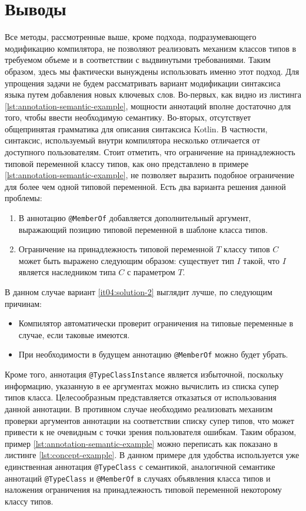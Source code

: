\section{Выводы}

Все методы, рассмотренные выше, кроме подхода, подразумевающего модификацию компилятора, не позволяют реализовать механизм классов типов в требуемом объеме и в соответствии с выдвинутыми требованиями. Таким образом, здесь мы фактически вынуждены использовать именно этот подход. Для упрощения задачи не будем рассматривать вариант модификации синтаксиса языка путем добавления новых ключевых слов. Во-первых, как видно из листинга \ref{lst:annotation-semantic-example}, мощности аннотаций вполне достаточно для того, чтобы ввести необходимую семантику. Во-вторых, отсутствует общепринятая грамматика для описания синтаксиса Kotlin. В частности, синтаксис, используемый внутри компилятора несколько отличается от доступного пользователям. Стоит отметить, что ограничение на принадлежность типовой переменной классу типов, как оно представлено в примере \ref{lst:annotation-semantic-example}, не позволяет выразить подобное ограничение для более чем одной типовой переменной. Есть два варианта решения данной проблемы:
\begin{enumerate}
    \item \label{it04:solution-1} В аннотацию \lstinline{@MemberOf} добавляется дополнительный аргумент, выражающий позицию типовой переменной в шаблоне класса типов. 
    \item \label{it04:solution-2} Ограничение на принадлежность типовой переменной $T$ классу типов $C$ может быть выражено следующим образом: существует тип $I$ такой, что $I$ является наследником типа $C$ с параметром $T$.
\end{enumerate}
В данном случае вариант \ref{it04:solution-2} выглядит лучше, по следующим причинам:
\begin{itemize}
    \item Компилятор автоматически проверит ограничения на типовые переменные в случае, если таковые имеются.
    \item При необходимости в будущем аннотацию \lstinline{@MemberOf} можно будет убрать.
\end{itemize}
Кроме того, аннотация \lstinline{@TypeClassInstance} является избыточной, поскольку информацию, указанную в ее аргументах можно вычислить из списка супер типов класса. Целесообразным представляется отказаться от использования данной аннотации. В противном случае необходимо реализовать механизм проверки аргументов аннотации на соответствии списку супер типов, что может привести к не очевидным с точки зрения пользователя ошибкам. Таким образом, пример \ref{lst:annotation-semantic-example} можно переписать как показано в листинге \ref{lst:concept-example}. В данном примере для удобства используется уже единственная аннотация \lstinline{@TypeClass} с семантикой, аналогичной семантике аннотаций \lstinline{@TypeClass} и \lstinline{@MemberOf} в случаях объявления класса типов и наложения ограничения на принадлежность типовой переменной некоторому классу типов. 

